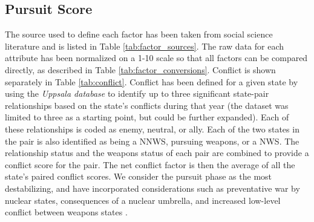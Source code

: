 \subsection{Pursuit Score}\label{s_pe}
The source used to define each factor has been taken from social science literature and is listed in Table \ref{tab:factor_sources}. The raw data for each attribute has been normalized on a 1-10 scale so that all factors can be compared directly, as described in Table \ref{tab:factor_conversions}. Conflict is shown separately in Table \ref{tab:conflict}. Conflict has been defined for a given state by using the \emph{Uppsala database} to identify up to three significant state-pair relationships based on the state's conflicts during that year (the dataset was limited to three as a starting point, but could be further expanded)\cite{conflict_ref}.   Each of these relationships is coded as enemy, neutral, or ally.  Each of the two states in the pair is also identified as being a \gls{NNWS}, pursuing weapons, or a \gls{NWS}.  The relationship status and the weapons status of each pair are combined to provide a conflict score for the pair. The net conflict factor is then the average of all the state's paired conflict scores. We consider the pursuit phase as the most destabilizing, and have incorporated considerations such as preventative war by nuclear states, consequences of a nuclear umbrella, and increased low-level conflict between weapons states \cite{geller_nuclear_1990, fuhrmann_targeting_2010, bell_questioning_2013-1}.

